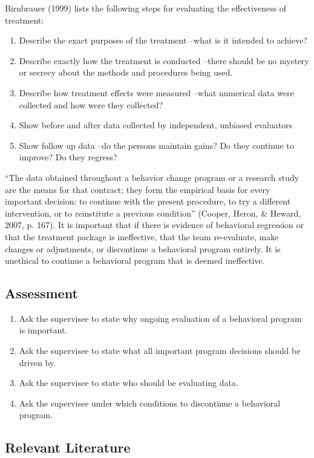Birnbrauer (1999) lists the following steps for evaluating the effectiveness of treatment:
\begin{enumerate}
\item Describe the exact purposes of the treatment –what is it intended to achieve? 
\item Describe exactly how the treatment is conducted –there should be no mystery or secrecy about the methods and procedures being used. 
\item Describe how treatment effects were measured –what numerical data were collected and how were they collected? 
\item Show before and after data collected by independent, unbiased evaluators
\item Show follow up data –do the persons maintain gains? Do they continue to improve? Do they regress? 
\end{enumerate}

``The data obtained throughout a behavior change program or a research study are the means for that contract; they form the empirical basis for every important decision: to continue with the present procedure, to try a different intervention, or to reinstitute a previous condition'' (Cooper, Heron, \& Heward, 2007, p. 167).  It is important that if there is evidence of behavioral regression or that the treatment package is ineffective, that the team re-evaluate, make changes or adjustments, or discontinue a behavioral program entirely.  It is unethical to continue a behavioral program that is deemed ineffective. 
%
\subsection{Assessment}
\begin{enumerate}
\item Ask the supervisee to state why ongoing evaluation of a behavioral program is important.
\item Ask the supervisee to state what all important program decisions should be driven by.
\item Ask the supervisee to state who should be evaluating data.
\item Ask the supervisee under which conditions to discontinue a behavioral program.
%
\end{enumerate}
%
\subsection{Relevant Literature}
\begin{refsection}
\nocite{test,alang2017police,clayton2018black}
\printbibliography[heading=none]
\end{refsection}
%
